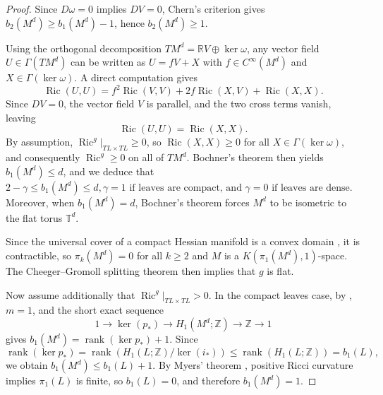 \begin{proof}
Since $D\omega = 0$ implies $DV = 0$, Chern's criterion \citep{chern1966} 
gives $b_2(M^d) \ge b_1(M^d) - 1$, hence $b_2(M^d) \ge 1$.

Using the orthogonal decomposition $TM^d = \mathbb{R}V \oplus \ker\omega$, 
any vector field $U \in \Gamma(TM^d)$ can be written as $U = fV + X$ with $f \in C^\infty(M^d)$ and 
$X \in \Gamma(\ker\omega)$. A direct computation gives
\[
  \operatorname{Ric}(U,U)
  = f^2\operatorname{Ric}(V,V) + 2f\operatorname{Ric}(X,V)
    + \operatorname{Ric}(X,X).
\]
Since $DV = 0$, the vector field $V$ is parallel, and the two cross terms vanish, leaving
\[
  \operatorname{Ric}(U,U) = \operatorname{Ric}(X,X).
\]
By assumption, $\operatorname{Ric}^g|_{TL \times TL} \ge 0$, so $\operatorname{Ric}(X,X) \ge 0$ 
for all $X \in \Gamma(\ker\omega)$, and consequently $\operatorname{Ric}^g \ge 0$ on all of $TM^d$. 
Bochner's theorem \citep{bochner1946,yano1953} then yields $b_1(M^d) \le d$, 
and we deduce that $2 - \gamma \le b_1(M^d) \le d, \gamma = 1 \text{ if leaves are compact, and } \gamma = 0 \text{ if leaves are dense.}$
Moreover, when $b_1(M^d) = d$, Bochner's theorem forces $M^d$ to be isometric to the flat torus $\mathbb{T}^d$.

Since the universal cover of a compact Hessian manifold is a convex domain \citep{shima1981},
 it is contractible, so $\pi_k(M^d) = 0$ for all $k \ge 2$ and $M$ is a $K(\pi_1(M^d),1)$-space. 
 The Cheeger--Gromoll splitting theorem \citep[Corollary~7.3.13]{petersen2006} then implies that $g$ is flat. 

Now assume additionally that $\operatorname{Ric}^g|_{TL \times TL} > 0$. In the compact leaves case, 
by \citep[p.~46]{godbillon1991}, $m = 1$, and the short exact sequence
\[
  1 \longrightarrow \ker(p_*)
  \longrightarrow H_1(M^d;\mathbb{Z})
  \longrightarrow \mathbb{Z}
  \longrightarrow 1
\]
gives $b_1(M^d) = \operatorname{rank}(\ker p_*) + 1$. Since
\[
  \operatorname{rank}(\ker p_*)
  = \operatorname{rank}\!\left(H_1(L;\mathbb{Z}) \big/ \ker(i_*)\right)
  \le \operatorname{rank}(H_1(L;\mathbb{Z})) = b_1(L),
\]
we obtain $b_1(M^d) \le b_1(L) + 1$. By Myers' theorem \citep{myers1941}, positive Ricci curvature
 implies $\pi_1(L)$ is finite, so $b_1(L) = 0$, and therefore $b_1(M^d) = 1$.


\end{proof}
